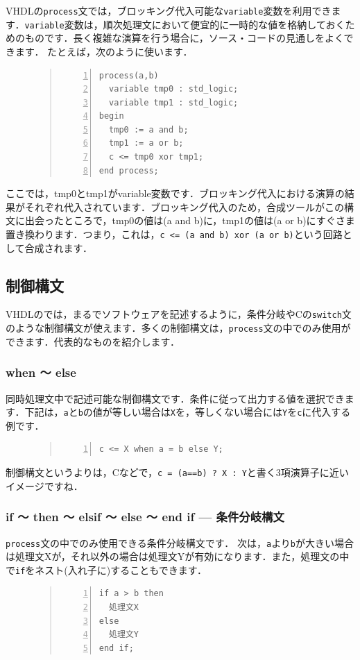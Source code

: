 \documentclass[a4paper,dvipdfmx]{jsarticle}
\begin{document}
VHDLの\verb|process|文では，ブロッキング代入可能な\verb|variable|変数を利用できます．\verb|variable|変数は，順次処理文において便宜的に一時的な値を格納しておくためのものです．長く複雑な演算を行う場合に，ソース・コードの見通しをよくできます．
たとえば，次のように使います．
\begin{figure}[H]
\begin{quote}
\begin{Verbatim}[frame=single, numbers=left, baselinestretch=0.8]
process(a,b)
  variable tmp0 : std_logic;
  variable tmp1 : std_logic;
begin
  tmp0 := a and b;
  tmp1 := a or b;
  c <= tmp0 xor tmp1;
end process;
\end{Verbatim}
\end{quote}
\end{figure}
ここでは，tmp0とtmp1がvariable変数です．ブロッキング代入における演算の結果がそれぞれ代入されています．ブロッキング代入のため，合成ツールがこの構文に出会ったところで，tmp0の値は(a and b)に，tmp1の値は(a or b)にすぐさま置き換わります．つまり，これは，\verb|c <= (a and b) xor (a or b)|という回路として合成されます．

\subsection{制御構文}
VHDLのでは，まるでソフトウェアを記述するように，条件分岐やCの\verb|switch|文のような制御構文が使えます．多くの制御構文は，\verb|process|文の中でのみ使用ができます．代表的なものを紹介します．

\subsubsection{when 〜 else}
同時処理文中で記述可能な制御構文です．条件に従って出力する値を選択できます．下記は，\verb|a|と\verb|b|の値が等しい場合は\verb|X|を，等しくない場合には\verb|Y|を\verb|c|に代入する例です．
\begin{figure}[H]
\begin{quote}
\begin{Verbatim}[frame=single, numbers=left, baselinestretch=0.8]
c <= X when a = b else Y;
\end{Verbatim}
\end{quote}
\end{figure}
制御構文というよりは，Cなどで，\verb|c = (a==b) ? X : Y|と書く3項演算子に近いイメージですね．

\subsubsection{if 〜 then 〜 elsif 〜 else 〜 end if --- 条件分岐構文}
\verb|process|文の中でのみ使用できる条件分岐構文です．
次は，\verb|a|より\verb|b|が大きい場合は処理文Xが，それ以外の場合は処理文Yが有効になります．また，処理文の中で\verb|if|をネスト(入れ子に)することもできます．
\begin{figure}[H]
\begin{quote}
\begin{Verbatim}[frame=single, numbers=left, baselinestretch=0.8]
if a > b then
  処理文X
else
  処理文Y
end if;
\end{Verbatim}
\end{quote}
\end{figure}
\end{document}
